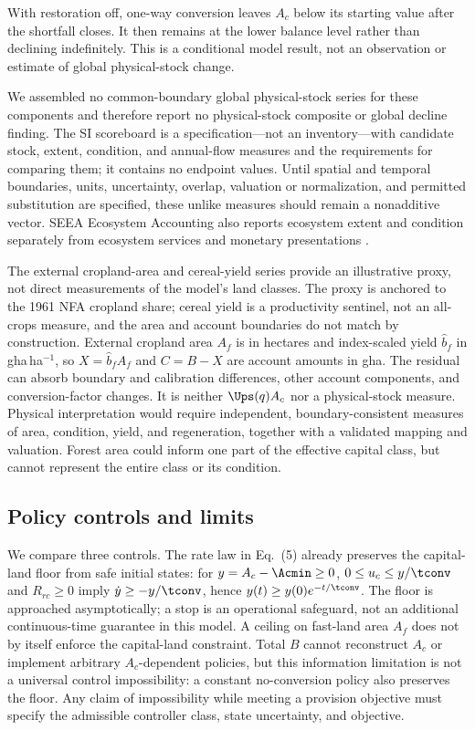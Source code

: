 With restoration off, one-way conversion leaves $A_c$ below its starting value after the shortfall closes. It then remains at the lower balance level rather than declining indefinitely. This is a conditional model result, not an observation or estimate of global physical-stock change.

We assembled no common-boundary global physical-stock series for these components and therefore report no physical-stock composite or global decline finding. The SI scoreboard is a specification—not an inventory—with candidate stock, extent, condition, and annual-flow measures and the requirements for comparing them; it contains no endpoint values. Until spatial and temporal boundaries, units, uncertainty, overlap, valuation or normalization, and permitted substitution are specified, these unlike measures should remain a nonadditive vector. SEEA Ecosystem Accounting also reports ecosystem extent and condition separately from ecosystem services and monetary presentations \citep{UN2021SEEA_EA}.

The external cropland-area and cereal-yield series provide an illustrative proxy, not direct measurements of the model's land classes. The proxy is anchored to the 1961 NFA cropland share; cereal yield is a productivity sentinel, not an all-crops measure, and the area and account boundaries do not match by construction. External cropland area $A_f$ is in hectares and index-scaled yield $\hat b_f$ in gha\,ha$^{-1}$, so $X=\hat b_fA_f$ and $C=B-X$ are account amounts in gha. The residual can absorb boundary and calibration differences, other account components, and conversion-factor changes. It is neither $\Ups(q)A_c$ nor a physical-stock measure. Physical interpretation would require independent, boundary-consistent measures of area, condition, yield, and regeneration, together with a validated mapping and valuation. Forest area could inform one part of the effective capital class, but cannot represent the entire class or its condition.

\subsection{Policy controls and limits}

We compare three controls. The rate law in Eq.~(5) already preserves the capital-land floor from safe initial states: for $y=A_c-\Acmin\ge0$, $0\le u_c\le y/\tconv$ and $R_{rc}\ge0$ imply $\dot y\ge-y/\tconv$, hence $y(t)\ge y(0)e^{-t/\tconv}$. The floor is approached asymptotically; a stop is an operational safeguard, not an additional continuous-time guarantee in this model. A ceiling on fast-land area $A_f$ does not by itself enforce the capital-land constraint. Total $B$ cannot reconstruct $A_c$ or implement arbitrary $A_c$-dependent policies, but this information limitation is not a universal control impossibility: a constant no-conversion policy also preserves the floor. Any claim of impossibility while meeting a provision objective must specify the admissible controller class, state uncertainty, and objective.

